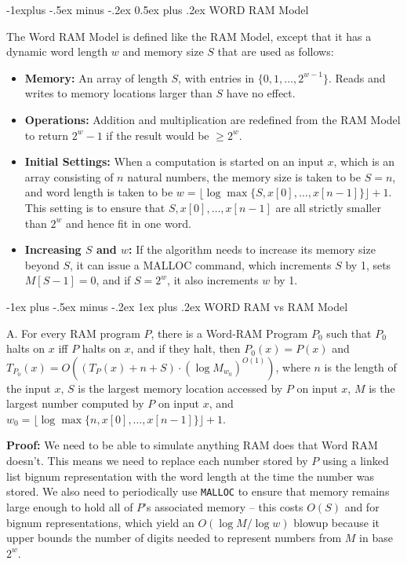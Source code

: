 \documentclass[10pt,landscape]{article}
\makeatletter
\renewcommand{\subsection}{\@startsection{subsection}{2}{0mm}%
                                {-1explus -.5ex minus -.2ex}%
                                {0.5ex plus .2ex}%
                                {\normalfont\normalsize\bfseries}}
\renewcommand{\subsubsection}{\@startsection{subsubsection}{3}{0mm}%
                                {-1ex plus -.5ex minus -.2ex}%
                                {1ex plus .2ex}%
                                {\normalfont\small\bfseries}}
\makeatother
\begin{document}
\begin{multicols*}{3}
\subsection{WORD RAM Model}

The Word RAM Model is defined like the RAM Model, except that it has a dynamic word length $w$ and memory size $S$ that are used as follows:

\begin{itemize}
\item \textbf{Memory:} An array of length $S$, with entries in $\{0, 1, \ldots, 2^{w-1}\}$. Reads and writes to memory locations larger than $S$ have no effect.
\item \textbf{Operations:} Addition and multiplication are redefined from the RAM Model to return $2^w - 1$ if the result would be $\geq 2^w$.
\item \textbf{Initial Settings:} When a computation is started on an input $x$, which is an array consisting of $n$ natural numbers, the memory size is taken to be $S = n$, and word length is taken to be $w = \lfloor \log \max\{S, x[0], \ldots, x[n-1]\} \rfloor + 1$. This setting is to ensure that $S, x[0], \ldots, x[n-1]$ are all strictly smaller than $2^w$ and hence fit in one word.
\item \textbf{Increasing $S$ and $w$:} If the algorithm needs to increase its memory size beyond $S$, it can issue a MALLOC command, which increments $S$ by 1, sets $M[S - 1] = 0$, and if $S = 2^w$, it also increments $w$ by 1.
\end{itemize}

\subsubsection{WORD RAM vs RAM Model}

A. For every RAM program $P$, there is a Word-RAM Program $P_0$ such that $P_0$ halts on $x$ iff $P$ halts on $x$, and if they halt, then $P_0(x) = P(x)$ and $T_{P_0}(x) = O\left((T_P(x) + n + S) \cdot \left(\log M_{w_0}\right)^{O(1)}\right)$, where $n$ is the length of the input $x$, $S$ is the largest memory location accessed by $P$ on input $x$, $M$ is the largest number computed by $P$ on input $x$, and $w_0 = \lfloor \log \max\{n, x[0], \ldots, x[n-1]\} \rfloor + 1$.

\textbf{Proof:}
We need to be able to simulate anything RAM does that Word RAM doesn't. This means we need to replace each number stored by \( P \) using a linked list bignum representation with the word length at the time the number was stored. We also need to periodically use \texttt{MALLOC} to ensure that memory remains large enough to hold all of \( P \)'s associated memory -- this costs \( O(S) \) and for bignum representations, which yield an \( O(\log M / \log w) \) blowup because it upper bounds the number of digits needed to represent numbers from \( M \) in base \( 2^w \).



\end{multicols*}
\end{document}

